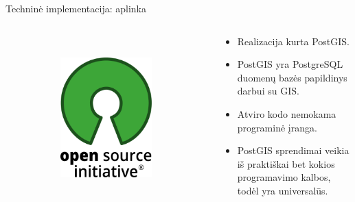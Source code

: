 \documentclass[14pt]{beamer}
\begin{document}
\begin{frame}{Techninė implementacija: aplinka}
\begin{columns}[c]
\begin{column}{.3\textwidth}
\begin{figure}[ht]
\begin{subfigure}[b]{\textwidth}
        \end{subfigure}
        \\[1ex]
        \begin{subfigure}[b]{\textwidth}
          \centering
          \includegraphics[width=.6\textwidth]{osi-logo}
        \end{subfigure}
      \end{figure}
    \end{column}
    \begin{column}{.7\textwidth}

      \begin{itemize}
        \item Realizacija kurta PostGIS.

        \item PostGIS yra PostgreSQL duomenų bazės papildinys darbui su GIS.

        \item Atviro kodo nemokama programinė įranga.

        \item PostGIS sprendimai veikia iš praktiškai bet kokios programavimo
          kalbos, todėl yra universalūs.

      \end{itemize}

    \end{column}
  \end{columns}
\end{frame}
\end{document}
